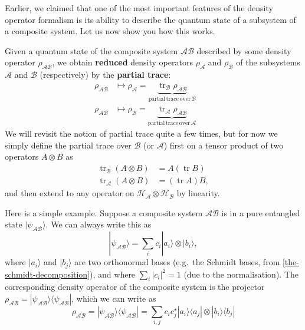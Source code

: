 \documentclass[fleqn]{article}
\begin{document}
Earlier, we claimed that one of the most important features of the density operator formalism is its ability to describe the quantum state of a subsystem of a composite system.
Let us now show you how this works.

Given a quantum state of the composite system \(\mathcal{AB}\) described by some density operator \(\rho_{\mathcal{AB}}\), we obtain \textbf{reduced} density operators \(\rho_{\mathcal{A}}\) and \(\rho_{\mathcal{B}}\) of the subsystems \(\mathcal{A}\) and \(\mathcal{B}\) (respectively) by the \textbf{partial trace}:
\[
  \begin{aligned}
    \rho_{\mathcal{AB}}
    &\longmapsto
    \rho_{\mathcal{A}}
    = \underbrace{\operatorname{tr}_{\mathcal{B}}\rho_{\mathcal{AB}}}_{\mathrm{partial\,trace\,over}\,\mathcal{B}}\qquad
  \\\rho_{\mathcal{AB}}
    &\longmapsto
    \rho_{\mathcal{B}}
    = \underbrace{\operatorname{tr}_{\mathcal{A}}\rho_{\mathcal{AB}}}_{\mathrm{partial\,trace\,over}\,\mathcal{A}}
  \end{aligned}
\]
We will revisit the notion of partial trace quite a few times, but for now we simply define the partial trace over \(\mathcal{B}\) (or \(\mathcal{A}\)) first on a tensor product of two operators \(A\otimes B\) as
\[
  \begin{aligned}
    \operatorname{tr}_{\mathcal{B}} (A\otimes B)
    &= A(\operatorname{tr}B)
  \\\operatorname{tr}_{\mathcal{A}} (A\otimes B)
    &= (\operatorname{tr}A) B,
  \end{aligned}
\]
and then extend to any operator on \(\mathcal{H}_{\mathcal{A}}\otimes\mathcal{H}_{\mathcal{B}}\) by linearity.

Here is a simple example.
Suppose a composite system \(\mathcal{AB}\) is in a pure entangled state \(|\psi_{\mathcal{AB}}\rangle\).
We can always write this as
\[
  |\psi_{\mathcal{AB}}\rangle
  = \sum_{i} c_{i} |a_i\rangle\otimes|b_i\rangle,
\]
where \(|a_i\rangle\) and \(|b_j\rangle\) are two orthonormal bases (e.g.~the Schmidt bases, from \ref{the-schmidt-decomposition}), and where \(\sum_i |c_i|^2 = 1\) (due to the normalisation).
The corresponding density operator of the composite system is the projector \(\rho_{\mathcal{AB}}= |\psi_{\mathcal{AB}}\rangle\langle\psi_{\mathcal{AB}}|\), which we can write as
\[
  \rho_{\mathcal{AB}}
  = |\psi_{\mathcal{AB}}\rangle\langle\psi_{\mathcal{AB}}|
  = \sum_{i,j} c_i c^\star_j |a_i\rangle\langle a_j| \otimes |b_i\rangle\langle b_j|
\]
\end{document}
